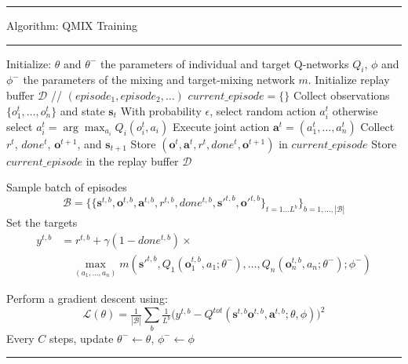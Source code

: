 \documentclass[varwidth, border=20pt]{standalone}
\begin{document}
\begingroup
\small                    
\begin{center}
  \begin{minipage}{0.99\linewidth} 
    \hrule height 0.7pt
    \vspace{3pt}
    Algorithm: QMIX Training
    \vspace{3pt}
    \hrule height 0.7pt
    \vspace{6pt}

   
    \begin{algorithmic}[1]
      \State Initialize: $\theta$ and  $\theta^-$ the parameters of individual and target Q-networks $Q_i$, $\phi$ and $\phi^-$ the parameters of the mixing and target-mixing network $m$.
      \State Initialize replay buffer $\mathcal{D}$ // $(episode_1, episode_2, \dots)$
        \State $current\_episode = \{ \}$ 
        \State Collect observations $\{o^t_1,\dots,o^t_n\}$ and state $\mathbf{s}_t$
              \State With probability $\epsilon$, select random action $a_i^t$
              \State otherwise select $a_i^t = \arg\max_{a_i} Q_i(o^t_i,a_i)$
         \EndFor
         \State Execute joint action $\mathbf{a}^t = (a_1^t,\dots,a_n^t)$
         \State Collect $r^t$, $done^t$, $\mathbf{o}^{t+1}$, and $\mathbf{s}_{t+1}$
         \State Store $(\mathbf{o}^t,\mathbf{a}^t,r^t,done^t,\mathbf{o}^{t+1})$ in $current\_episode$
        \EndWhile
        \State Store $current\_episode$ in the replay buffer $\mathcal{D}$
        
          \State Sample batch of episodes 
          \[ 
            \mathcal{B} = \{ \{\mathbf{s}^{t,b},\mathbf{o}^{t,b},\mathbf{a}^{t,b},r^{t,b},done^{t,b},\mathbf{s'}^{t,b},\mathbf{o'}^{t,b}\}_{t=1 ... L^b}\}_{b=1, ..., |\mathcal{B}|}\]
          \State Set the targets
          \Statex
          \begin{align*}
            y^{t,b} &= r^{t,b} + \gamma (1 - done^{t,b}) \times \\
            &\quad \max_{(a_1, \dots, a_n)} m(\mathbf{s'}^{t,b}, Q_1(\mathbf{o}_1^{t,b}, a_1;\theta^-), \dots, Q_n(\mathbf{o}_n^{t,b}, a_n;\theta^-); \phi^-)
            \end{align*}
            
          \State Perform a gradient descent using:
          \Statex
          \[
            \mathcal{L}(\theta)=\tfrac{1}{|\mathcal{B}|}\sum_b \tfrac{1}{L^b} \Big(y^{t,b}- Q^{tot}(\mathbf{s}^{t,b}\mathbf{o}^{t,b},\mathbf{a}^{t,b};\theta, \phi)\Big)^2
          \]
          \State Every $C$ steps, update $\theta^- \leftarrow \theta$, $\phi^- \leftarrow \phi$ 
        \EndIf
      \EndWhile
    \end{algorithmic}

    \vspace{6pt}
    \hrule height 0.7pt
  \end{minipage}
\end{center}
\endgroup
\end{document}
